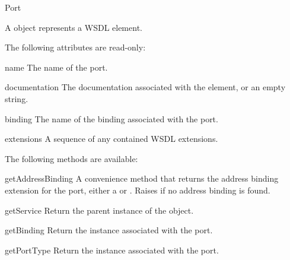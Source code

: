 \begin{classdesc}{Port}{}

A  object represents a WSDL  element.

The following attributes are read-only:

\begin{memberdesc}{name}
The name of the port.
\end{memberdesc}

\begin{memberdesc}{documentation}
The documentation associated with the element, or an empty string.
\end{memberdesc}

\begin{memberdesc}{binding}
The name of the binding associated with the port.
\end{memberdesc}

\begin{memberdesc}{extensions}
A sequence of any contained WSDL extensions.
\end{memberdesc}

The following methods are available:

\begin{methoddesc}{getAddressBinding}{}
A convenience method that returns the address binding extension for the 
port, either a  or .
Raises  if no address binding is found.
\end{methoddesc}

\begin{methoddesc}{getService}{}
Return the parent  instance of the object.
\end{methoddesc}

\begin{methoddesc}{getBinding}{}
Return the  instance associated with the port.
\end{methoddesc}

\begin{methoddesc}{getPortType}{}
Return the  instance associated with the port.
\end{methoddesc}

\end{classdesc}

